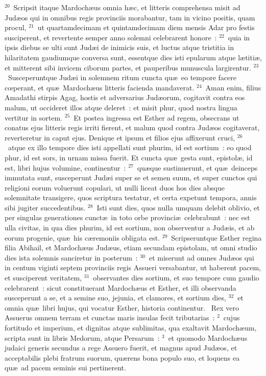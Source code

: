 ${}^{20}$~Scripsit itaque Mardoch\ae us omnia h\ae c, et litteris comprehensa misit ad Jud\ae os qui in omnibus regis provinciis morabantur, tam in vicino positis, quam procul,
${}^{21}$~ut quartamdecimam et quintamdecimam diem mensis Adar pro festis susciperent, et revertente semper anno solemni celebrarent honore~:
${}^{22}$~quia in ipsis diebus se ulti sunt Jud\ae i de inimicis suis, et luctus atque tristitia in hilaritatem gaudiumque conversa sunt, essentque dies isti epularum atque l\ae titi\ae , et mitterent sibi invicem ciborum partes, et pauperibus munuscula largirentur.
${}^{23}$~Susceperuntque Jud\ae i in solemnem ritum cuncta qu\ae\ eo tempore facere cœperant, et qu\ae\ Mardoch\ae us litteris facienda mandaverat.
${}^{24}$~Aman enim, filius Amadathi stirpis Agag, hostis et adversarius Jud\ae orum, cogitavit contra eos malum, ut occideret illos atque deleret~: et misit phur, quod nostra lingua vertitur in sortem.
${}^{25}$~Et postea ingressa est Esther ad regem, obsecrans ut conatus ejus litteris regis irriti fierent, et malum quod contra Jud\ae os cogitaverat, reverteretur in caput ejus. Denique et ipsum et filios ejus affixerunt cruci,
${}^{26}$~atque ex illo tempore dies isti appellati sunt phurim, id est sortium~: eo quod phur, id est sors, in urnam missa fuerit. Et cuncta qu\ae\ gesta sunt, epistol\ae , id est, libri hujus volumine, continentur~:
${}^{27}$~qu\ae que sustinuerunt, et qu\ae\ deinceps immutata sunt, susceperunt Jud\ae i super se et semen suum, et super cunctos qui religioni eorum voluerunt copulari, ut nulli liceat duos hos dies absque solemnitate transigere, quos scriptura testatur, et certa expetunt tempora, annis sibi jugiter succedentibus.
${}^{28}$~Isti sunt dies, quos nulla umquam delebit oblivio, et per singulas generationes cunct\ae\ in toto orbe provinci\ae\ celebrabunt~: nec est ulla civitas, in qua dies phurim, id est sortium, non observentur a Jud\ae is, et ab eorum progenie, qu\ae\ his c\ae remoniis obligata est.
${}^{29}$~Scripseruntque Esther regina filia Abihail, et Mardoch\ae us Jud\ae us, etiam secundam epistolam, ut omni studio dies ista solemnis sanciretur in posterum~:
${}^{30}$~et miserunt ad omnes Jud\ae os qui in centum viginti septem provinciis regis Assueri versabantur, ut haberent pacem, et susciperent veritatem,
${}^{31}$~observantes dies sortium, et suo tempore cum gaudio celebrarent~: sicut constituerant Mardoch\ae us et Esther, et illi observanda susceperunt a se, et a semine suo, jejunia, et clamores, et sortium dies,
${}^{32}$~et omnia qu\ae\ libri hujus, qui vocatur Esther, historia continentur.
~\lettrine[lines=10,image=true,loversize=0.05,lraise=-0.03]{R}{}ex vero Assuerus omnem terram et cunctas maris insulas fecit tributarias~:
${}^{2}$~cujus fortitudo et imperium, et dignitas atque sublimitas, qua exaltavit Mardoch\ae um, scripta sunt in libris Medorum, atque Persarum~:
${}^{3}$~et quomodo Mardoch\ae us judaici generis secundus a rege Assuero fuerit, et magnus apud Jud\ae os, et acceptabilis plebi fratrum suorum, qu\ae rens bona populo suo, et loquens ea qu\ae\ ad pacem seminis sui pertinerent.


